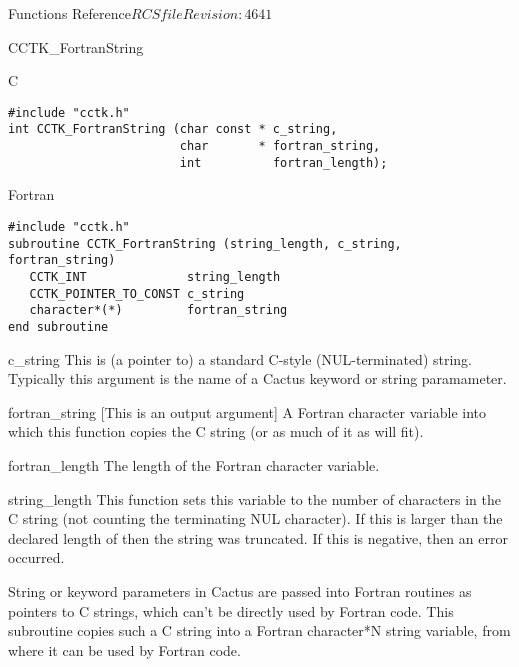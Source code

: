 \begin{cactuspart}{ Functions Reference}{$RCSfile$}{$Revision: 4641 $}
\begin{FunctionDescription}{CCTK\_FortranString}
\begin{SynopsisSection}
\begin{Synopsis}{C}
\begin{verbatim}
#include "cctk.h"
int CCTK_FortranString (char const * c_string,
                        char       * fortran_string,
                        int          fortran_length);
\end{verbatim}
\end{Synopsis}
\begin{Synopsis}{Fortran}
\begin{verbatim}
#include "cctk.h"
subroutine CCTK_FortranString (string_length, c_string, fortran_string)
   CCTK_INT              string_length
   CCTK_POINTER_TO_CONST c_string
   character*(*)         fortran_string
end subroutine
\end{verbatim}
\end{Synopsis}
\end{SynopsisSection}

\begin{ParameterSection}
\begin{Parameter}{c\_string}
This is (a pointer to) a standard C-style (NUL-terminated) string.
Typically this argument is the name of a Cactus keyword or string
paramameter.
\end{Parameter}
\begin{Parameter}{fortran\_string}
[This is an output argument]
A Fortran character variable into which this function copies
the C string (or as much of it as will fit).
\end{Parameter}
\begin{Parameter}{fortran\_length}
The length of the Fortran character variable.
\end{Parameter}
\end{ParameterSection}

\begin{ResultSection}
\begin{Result}{string\_length}
This function sets this variable to the number of characters in the
C string (not counting the terminating NUL character).  If this is
larger than the declared length of  then the
string was truncated.  If this is negative, then an error occurred.
\end{Result}
\end{ResultSection}

\begin{Discussion}
String or keyword parameters in Cactus are passed into Fortran routines
as pointers to C strings, which can't be directly used by Fortran code.
This subroutine copies such a C string into a Fortran character*N string
variable, from where it can be used by Fortran code.
\end{Discussion}


\end{FunctionDescription}
\end{cactuspart}
